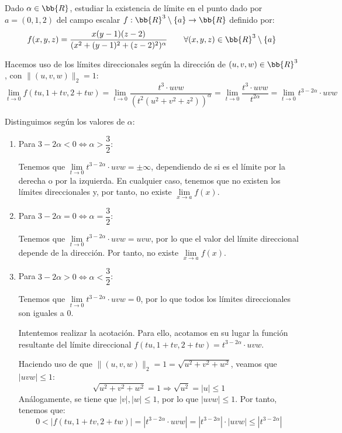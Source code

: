 \begin{ejercicio}
    Dado $\alpha \in \bb{R}$, estudiar la existencia de límite en el punto dado por $a = (0, 1, 2)$ del campo escalar $f : \bb{R}^3 \setminus \{a\} \to \bb{R}$ definido por:
    \begin{equation*}
        f(x,y,z) = \frac{x(y-1)(z-2)}{(x^2+(y-1)^2+(z-2)^2)^\alpha} \qquad \forall (x,y,z)\in \bb{R}^3\setminus \{a\}
    \end{equation*}

    Hacemos uso de los límites direccionales según la dirección de $(u,v,w)\in \bb{R}^3$, con $\|(u,v,w)\|_2=1$:
    \begin{equation*}
        \lim_{t\to 0}f(tu, 1+tv, 2+tw)
        = \lim_{t\to 0}\frac{t^3 \cdot uvw}{(t^2(u^2+v^2+z^2))^\alpha}
        = \lim_{t\to 0}\frac{t^3 \cdot uvw}{t^{2\alpha}}
        = \lim_{t\to 0} t^{3-2\alpha} \cdot uvw
    \end{equation*}

    Distinguimos según los valores de $\alpha$:
    \begin{enumerate}
        \item Para $3-2\alpha<0 \Longleftrightarrow \alpha>\dfrac{3}{2}$:

        Tenemos que $\lim\limits_{t\to 0} t^{3-2\alpha} \cdot uvw=\pm \infty$, dependiendo de si es el límite por la derecha o por la izquierda. En cualquier caso, tenemos que no existen los límites direccionales y, por tanto, no existe $\lim\limits_{x\to a} f(x)$.

        \item Para $3-2\alpha=0 \Longleftrightarrow \alpha=\dfrac{3}{2}$:

        Tenemos que $\lim\limits_{t\to 0} t^{3-2\alpha} \cdot uvw=uvw$, por lo que el valor del límite direccional depende de la dirección. Por tanto, no existe $\lim\limits_{x\to a} f(x)$.

        \item Para $3-2\alpha>0 \Longleftrightarrow \alpha<\dfrac{3}{2}$:

        Tenemos que $\lim\limits_{t\to 0} t^{3-2\alpha} \cdot uvw=0$, por lo que todos los límites direccionales son iguales a 0.

        Intentemos realizar la acotación. Para ello, acotamos en su lugar la función resultante del límite direccional $f(tu, 1+tv, 2+tw)=t^{3-2\alpha} \cdot uvw$.

        Haciendo uso de que $\|(u,v,w)\|_2=1=\sqrt{u^2+v^2+w^2}$, veamos que $|uvw|\leq 1$:
         \begin{equation*}
             \sqrt{u^2+v^2+w^2}=1 \Longrightarrow \sqrt{u^2}=|u|\leq 1
         \end{equation*}
         Análogamente, se tiene que $|v|,|w|\leq 1$, por lo que $|uvw|\leq 1$. Por tanto, tenemos que:
         \begin{equation*}
             0<|f(tu, 1+tv, 2+tw)|
             =|t^{3-2\alpha} \cdot uvw|
             =|t^{3-2\alpha}| \cdot |uvw|
             \leq |t^{3-2\alpha}|
         \end{equation*}


\end{enumerate}
\end{ejercicio}
